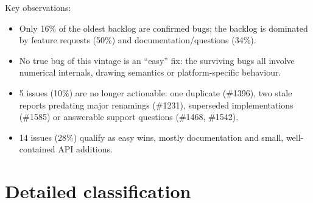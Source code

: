 \documentclass[a4paper,11pt]{article}
\begin{document}
Key observations:
\begin{itemize}[noitemsep]
  \item Only 16\% of the oldest backlog are confirmed bugs; the backlog is
        dominated by feature requests (50\%) and documentation/questions (34\%).
  \item No true bug of this vintage is an ``easy'' fix: the surviving bugs all
        involve numerical internals, drawing semantics or platform-specific
        behaviour.
  \item 5 issues (10\%) are no longer actionable: one duplicate (\#1396), two
        stale reports predating major renamings (\#1231), superseded
        implementations (\#1585) or answerable support questions
        (\#1468, \#1542).
  \item 14 issues (28\%) qualify as easy wins, mostly documentation and small,
        well-contained API additions.
\end{itemize}

\section{Detailed classification}
\end{document}
